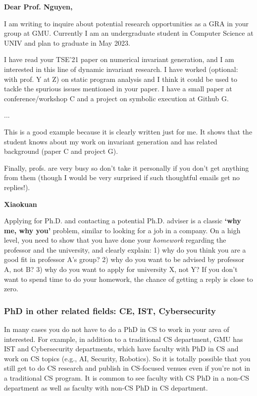 \documentclass[11pt]{article}
\newenvironment{commentbox}[1][]{
\small
    \begin{mybox}
    {\small \textbf{#1}}
 }{
   \end{mybox}
}
\begin{document}
\begin{commentbox}[Dear Prof. Nguyen,]

I am writing to inquire about potential research opportunities as a GRA in your group at GMU. Currently I am an undergraduate student in Computer Science at UNIV and plan to graduate in May 2023.

 
I have read your TSE'21 paper on numerical invariant generation, and I am interested in this line of dynamic invariant research. I have worked (optional: with prof. Y at Z) on static program analysis and I think it could be used to tackle the spurious issues mentioned in your paper. I have a small paper at conference/workshop C and a project on symbolic execution at Github G.

...

This is a good example because it is clearly written just for me.  It shows that the student knows about my work on invariant generation and has related  background (paper C and project G). 
\end{commentbox}

Finally, profs. are very busy so don't take it personally if you don't get anything from them (though I would be very surprised if such thoughtful emails get no replies!). 


\begin{commentbox}[Xiaokuan]
    Applying for Ph.D. and contacting a potential Ph.D. adviser is a classic {\bf `why me, why you'} problem, 
similar to looking for a job in a company.
On a high level,
you need to show that you have done your {\it homework}
regarding the professor and the university,
and clearly explain:
1) why do you think you are a good fit in professor A's group?
2) why do you want to be advised by professor A, not B? 
3) why do you want to apply for university X, not Y?
If you don't want to spend time to do your homework,
the chance of getting a reply is close to zero.
\end{commentbox}

\subsubsection{PhD in other related fields: CE, IST, Cybersecurity}\label{sec:related-fields}

In many cases you do not have to do a PhD in CS to work in your area of interested. For example, in addition to a traditional CS department, GMU has IST and Cybersecurity departments, which have faculty  with PhD in CS and work on CS topics (e.g., AI, Security, Robotics).  So it is totally possible that you still get to do CS research and publish in CS-focused venues even if you're not in a traditional CS program.  It is  common to see faculty with CS PhD in a non-CS department as well as faculty with non-CS PhD in CS department.  
\end{document}
